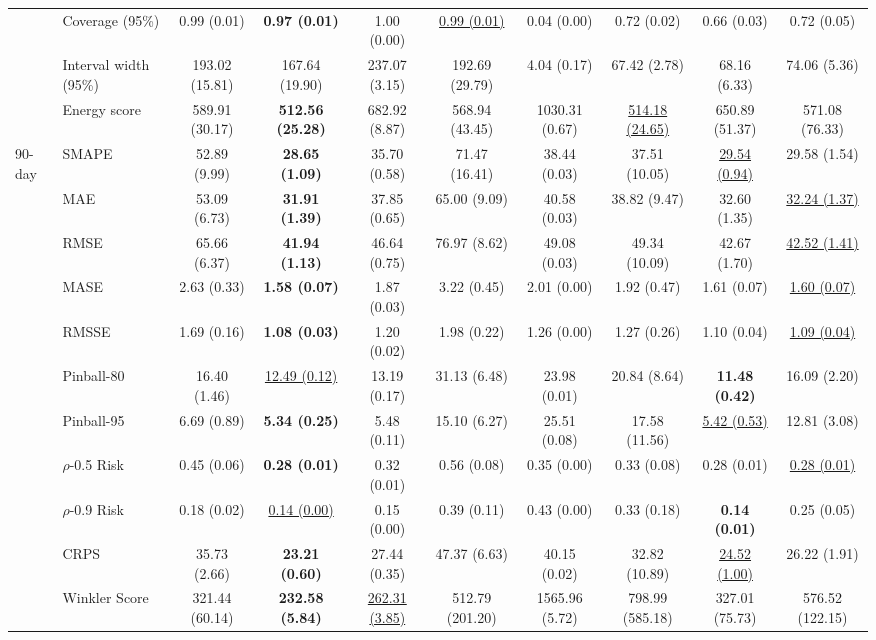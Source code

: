 \begin{table}[t]
\begin{tabular}{llcccccccc}
 & Coverage (95\%) & 0.99 (0.01) & \textbf{0.97 (0.01)} & 1.00 (0.00) & \underline{0.99 (0.01)} & 0.04 (0.00) & 0.72 (0.02) & 0.66 (0.03) & 0.72 (0.05) \\
 & Interval width (95\%) & 193.02 (15.81) & 167.64 (19.90) & 237.07 (3.15) & 192.69 (29.79) & 4.04 (0.17) & 67.42 (2.78) & 68.16 (6.33) & 74.06 (5.36) \\
 & Energy score & 589.91 (30.17) & \textbf{512.56 (25.28)} & 682.92 (8.87) & 568.94 (43.45) & 1030.31 (0.67) & \underline{514.18 (24.65)} & 650.89 (51.37) & 571.08 (76.33) \\
\midrule
\multirow{14}{*}{90-day} & SMAPE & 52.89 (9.99) & \textbf{28.65 (1.09)} & 35.70 (0.58) & 71.47 (16.41) & 38.44 (0.03) & 37.51 (10.05) & \underline{29.54 (0.94)} & 29.58 (1.54) \\
 & MAE & 53.09 (6.73) & \textbf{31.91 (1.39)} & 37.85 (0.65) & 65.00 (9.09) & 40.58 (0.03) & 38.82 (9.47) & 32.60 (1.35) & \underline{32.24 (1.37)} \\
 & RMSE & 65.66 (6.37) & \textbf{41.94 (1.13)} & 46.64 (0.75) & 76.97 (8.62) & 49.08 (0.03) & 49.34 (10.09) & 42.67 (1.70) & \underline{42.52 (1.41)} \\
 & MASE & 2.63 (0.33) & \textbf{1.58 (0.07)} & 1.87 (0.03) & 3.22 (0.45) & 2.01 (0.00) & 1.92 (0.47) & 1.61 (0.07) & \underline{1.60 (0.07)} \\
 & RMSSE & 1.69 (0.16) & \textbf{1.08 (0.03)} & 1.20 (0.02) & 1.98 (0.22) & 1.26 (0.00) & 1.27 (0.26) & 1.10 (0.04) & \underline{1.09 (0.04)} \\
 & Pinball-80 & 16.40 (1.46) & \underline{12.49 (0.12)} & 13.19 (0.17) & 31.13 (6.48) & 23.98 (0.01) & 20.84 (8.64) & \textbf{11.48 (0.42)} & 16.09 (2.20) \\
 & Pinball-95 & 6.69 (0.89) & \textbf{5.34 (0.25)} & 5.48 (0.11) & 15.10 (6.27) & 25.51 (0.08) & 17.58 (11.56) & \underline{5.42 (0.53)} & 12.81 (3.08) \\
 & $\rho$-0.5 Risk & 0.45 (0.06) & \textbf{0.28 (0.01)} & 0.32 (0.01) & 0.56 (0.08) & 0.35 (0.00) & 0.33 (0.08) & 0.28 (0.01) & \underline{0.28 (0.01)} \\
 & $\rho$-0.9 Risk & 0.18 (0.02) & \underline{0.14 (0.00)} & 0.15 (0.00) & 0.39 (0.11) & 0.43 (0.00) & 0.33 (0.18) & \textbf{0.14 (0.01)} & 0.25 (0.05) \\
 & CRPS & 35.73 (2.66) & \textbf{23.21 (0.60)} & 27.44 (0.35) & 47.37 (6.63) & 40.15 (0.02) & 32.82 (10.89) & \underline{24.52 (1.00)} & 26.22 (1.91) \\
 & Winkler Score & 321.44 (60.14) & \textbf{232.58 (5.84)} & \underline{262.31 (3.85)} & 512.79 (201.20) & 1565.96 (5.72) & 798.99 (585.18) & 327.01 (75.73) & 576.52 (122.15) \\

\end{tabular}
\end{table}
